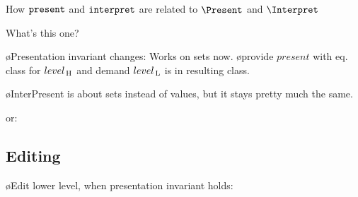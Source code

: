How ${\tt present}$ and ${\tt interpret}$ are related to $\Present$ and $\Interpret$


What's this one?


\bl
\o Presentation invariant changes: Works on sets now.
\o provide $present$ with eq. class for $level_{\, \mathrm H}$ and demand $level_{\, \mathrm L}$ is in resulting class.
\el



\bl
\o {\sc InterPresent} is about sets instead of values, but it stays pretty much the same.
\el


or:




\subsection{Editing} \label{sect:singleExtra_Editing}

\bl
\o Edit lower level, when presentation invariant holds:
\el



